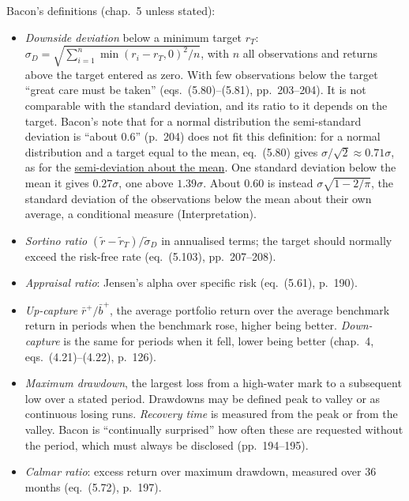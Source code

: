 \begin{qfmethod}\label{meth:downside-appraisal-measures}
 Bacon's definitions \citep[3rd ed., 2023]{wide-bacon-attribution} (chap.~5 unless stated):
\begin{itemize}
\item \emph{Downside deviation} below a minimum target $r_T$: $\sigma_D=\sqrt{\sum_{i=1}^n\min(r_i-r_T,0)^2/n}$, with $n$ all observations and returns above the target entered as zero. With few observations below the target ``great care must be taken'' (eqs.~(5.80)--(5.81), pp.~203--204). It is not comparable with the standard deviation, and its ratio to it depends on the target. Bacon's note that for a normal distribution the semi-standard deviation is ``about 0.6'' (p.~204) does not fit this definition: for a normal distribution and a target equal to the mean, eq.~(5.80) gives $\sigma/\sqrt2\approx0.71\sigma$, as for the \hyperref[def:downside-relative-dispersion]{semi-deviation about the mean}. One standard deviation below the mean it gives $0.27\sigma$, one above $1.39\sigma$. About 0.60 is instead $\sigma\sqrt{1-2/\pi}$, the standard deviation of the observations below the mean about their own average, a conditional measure (Interpretation).
\item \emph{Sortino ratio} $(\tilde r-\tilde r_T)/\tilde\sigma_D$ in annualised terms; the target should normally exceed the risk-free rate (eq.~(5.103), pp.~207--208).
\item \emph{Appraisal ratio}: Jensen's alpha over specific risk (eq.~(5.61), p.~190).
\item \emph{Up-capture} $\bar r^+/\bar b^+$, the average portfolio return over the average benchmark return in periods when the benchmark rose, higher being better. \emph{Down-capture} is the same for periods when it fell, lower being better (chap.~4, eqs.~(4.21)--(4.22), p.~126).
\item \emph{Maximum drawdown}, the largest loss from a high-water mark to a subsequent low over a stated period. Drawdowns may be defined peak to valley or as continuous losing runs. \emph{Recovery time} is measured from the peak or from the valley. Bacon is ``continually surprised'' how often these are requested without the period, which must always be disclosed (pp.~194--195).
\item \emph{Calmar ratio}: excess return over maximum drawdown, measured over 36 months (eq.~(5.72), p.~197).
\end{itemize}


\end{qfmethod}
